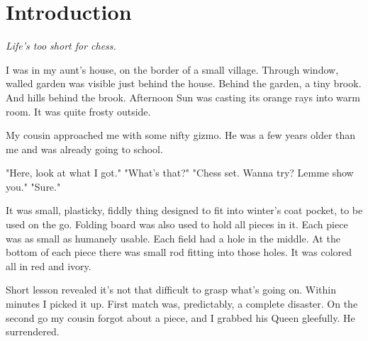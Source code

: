 

\chapter*{Introduction}
\label{ch:Introduction}

\begin{flushright}
\parbox{0.6\textwidth}{
\emph{Life's too short for chess. \newline
{} } }
\end{flushright}

\noindent
I was in my aunt's house, on the border of a small village.
Through window, walled garden was visible just behind the house.
Behind the garden, a tiny brook. And hills behind the brook.
Afternoon Sun was casting its orange rays into warm room. It
was quite frosty outside.

My cousin approached me with some nifty gizmo. He was a
few years older than me and was already going to school.

\noindent
"Here, look at what I got." \newline
\hspace*{\fill}"What's that?" \newline
"Chess set. Wanna try? Lemme show you." \newline
\hspace*{\fill}"Sure."

It was small, plasticky, fiddly thing designed to fit into winter's
coat pocket, to be used on the go. Folding board was also used to
hold all pieces in it. Each piece was as small as humanely usable.
Each field had a hole in the middle. At the bottom of each piece
there was small rod fitting into those holes. It was colored all
in red and ivory.

Short lesson revealed it's not that difficult to grasp what's going
on. Within minutes I picked it up. First match was, predictably, a
complete disaster. On the second go my cousin forgot about a piece,
and I grabbed his Queen gleefully. He surrendered.

